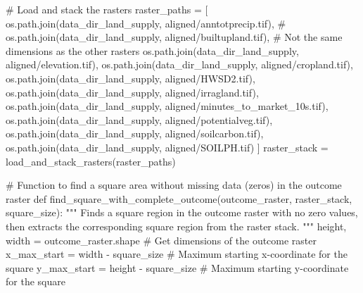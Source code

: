 \documentclass[
  letterpaper,
]{article}
\newenvironment{Shaded}{\begin{snugshade}}{\end{snugshade}}
\newcommand{\CommentTok}[1]{\textcolor[rgb]{0.37,0.37,0.37}{#1}}
\newcommand{\KeywordTok}[1]{\textcolor[rgb]{0.00,0.23,0.31}{#1}}
\newcommand{\NormalTok}[1]{\textcolor[rgb]{0.00,0.23,0.31}{#1}}
\newcommand{\OperatorTok}[1]{\textcolor[rgb]{0.37,0.37,0.37}{#1}}
\newcommand{\StringTok}[1]{\textcolor[rgb]{0.13,0.47,0.30}{#1}}
\begin{document}
\begin{Shaded}
\begin{Highlighting}[]
\CommentTok{\# Load and stack the rasters}
\NormalTok{raster\_paths }\OperatorTok{=}\NormalTok{ [}
\NormalTok{    os.path.join(data\_dir\_land\_supply, }\StringTok{\textquotesingle{}aligned/anntotprecip.tif\textquotesingle{}}\NormalTok{),}
    \CommentTok{\# os.path.join(data\_dir\_land\_supply, \textquotesingle{}aligned/builtupland.tif\textquotesingle{}), \# Not the same dimensions as the other rasters}
\NormalTok{    os.path.join(data\_dir\_land\_supply, }\StringTok{\textquotesingle{}aligned/elevation.tif\textquotesingle{}}\NormalTok{),}
\NormalTok{    os.path.join(data\_dir\_land\_supply, }\StringTok{\textquotesingle{}aligned/cropland.tif\textquotesingle{}}\NormalTok{),}
\NormalTok{    os.path.join(data\_dir\_land\_supply, }\StringTok{\textquotesingle{}aligned/HWSD2.tif\textquotesingle{}}\NormalTok{),}
\NormalTok{    os.path.join(data\_dir\_land\_supply, }\StringTok{\textquotesingle{}aligned/irragland.tif\textquotesingle{}}\NormalTok{),}
\NormalTok{    os.path.join(data\_dir\_land\_supply, }\StringTok{\textquotesingle{}aligned/minutes\_to\_market\_10s.tif\textquotesingle{}}\NormalTok{),}
\NormalTok{    os.path.join(data\_dir\_land\_supply, }\StringTok{\textquotesingle{}aligned/potentialveg.tif\textquotesingle{}}\NormalTok{),}
\NormalTok{    os.path.join(data\_dir\_land\_supply, }\StringTok{\textquotesingle{}aligned/soilcarbon.tif\textquotesingle{}}\NormalTok{),}
\NormalTok{    os.path.join(data\_dir\_land\_supply, }\StringTok{\textquotesingle{}aligned/SOILPH.tif\textquotesingle{}}\NormalTok{)}
\NormalTok{]}
\NormalTok{raster\_stack }\OperatorTok{=}\NormalTok{ load\_and\_stack\_rasters(raster\_paths)}

\CommentTok{\# Function to find a square area without missing data (zeros) in the outcome raster}
\KeywordTok{def}\NormalTok{ find\_square\_with\_complete\_outcome(outcome\_raster, raster\_stack, square\_size):}
    \CommentTok{"""}
\CommentTok{    Finds a square region in the outcome raster with no zero values,}
\CommentTok{    then extracts the corresponding square region from the raster stack.}
\CommentTok{    """}
\NormalTok{    height, width }\OperatorTok{=}\NormalTok{ outcome\_raster.shape  }\CommentTok{\# Get dimensions of the outcome raster}
\NormalTok{    x\_max\_start }\OperatorTok{=}\NormalTok{ width }\OperatorTok{{-}}\NormalTok{ square\_size     }\CommentTok{\# Maximum starting x{-}coordinate for the square}
\NormalTok{    y\_max\_start }\OperatorTok{=}\NormalTok{ height }\OperatorTok{{-}}\NormalTok{ square\_size    }\CommentTok{\# Maximum starting y{-}coordinate for the square}
    

\end{Highlighting}
\end{Shaded}
\end{document}

